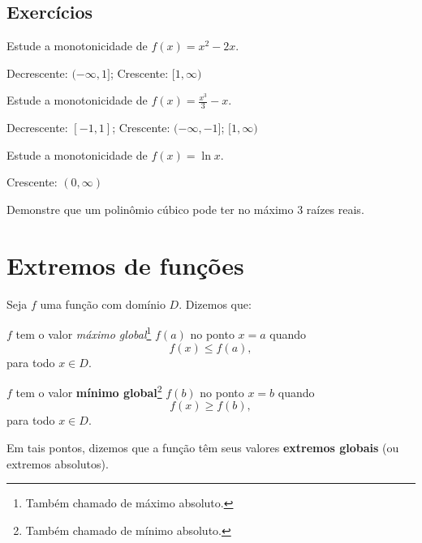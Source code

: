 \cleardoublepage\documentclass[../main.tex]{subfiles}
\begin{document}
\subsection{Exercícios}

\begin{exer}
  Estude a monotonicidade de $f(x) = x^2 - 2x$.
\end{exer}
\begin{resp}
  Decrescente: $(-\infty, 1]$; Crescente: $[1, \infty)$
\end{resp}

\begin{exer}
  Estude a monotonicidade de $\displaystyle f(x) = \frac{x^3}{3}-x$.
\end{exer}
\begin{resp}
  Decrescente: $[-1, 1]$; Crescente: $(-\infty, -1]$; $[1, \infty)$
\end{resp}

\begin{exer}
  Estude a monotonicidade de $\displaystyle f(x) = \ln x$.
\end{exer}
\begin{resp}
  Crescente: $(0, \infty)$
\end{resp}


\begin{exer}
  Demonstre que um polinômio cúbico pode ter no máximo $3$ raízes reais.
\end{exer}
\section{Extremos de funções}\label{sec:extremosFunc}
\begin{framed}
\begin{definition}
Seja $f$ uma função com domínio $D$. Dizemos que:
\begin{compactenum}[i.]
\item $f$ tem o valor \emph{máximo global}\footnote{Também chamado de máximo absoluto.} $f(a)$ no ponto $x=a$ quando
\begin{equation}
  f(x) \leq f(a),
\end{equation}
para todo $x\in D$. 
\item  $f$ tem o valor \textbf{mínimo global}\footnote{Também chamado de mínimo absoluto.} $f(b)$ no ponto $x=b$ quando
\begin{equation}
  f(x) \geq f(b),
\end{equation}
para todo $x\in D$. 
\end{compactenum}
Em tais pontos, dizemos que a função têm seus valores \textbf{extremos globais} (ou extremos absolutos).
\end{definition}
\end{framed}
\end{document}
